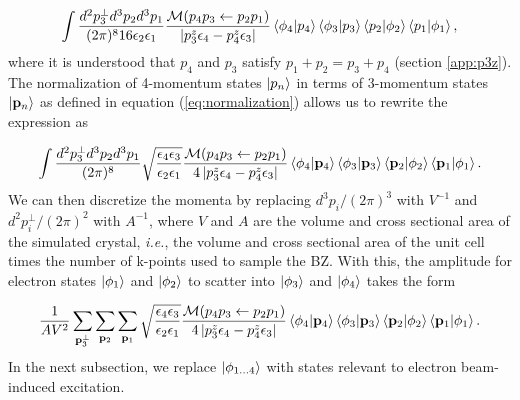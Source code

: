 \documentclass[twoside,twocolumn,9pt]{article}
\begin{document}
\begin{equation} 
  \label{eq:ampUseDelta} 
  \begin{aligned} 
    \int\frac{d^2p_3^\perp
    d^3p_2d^3p_1} {(2\pi)^{8} 16\epsilon_2\epsilon_1}
    \frac{\mathcal{M}(p_4p_3\leftarrow p_2p_1)}
    {\left|p_3^z\epsilon_4 - p_4^z\epsilon_3\right|} \bra{\phi_4}\ket{p_4}
    \bra{\phi_3}\ket{p_3} \bra{p_2}\ket{\phi_2} \bra{p_1}\ket{\phi_1},
  \end{aligned} 
\end{equation}
%
where it is understood that $p_4$ and $p_3$ satisfy $p_1 + p_2 = p_3 + p_4$
(section \ref{app:p3z}).
The normalization of 4-momentum states $\ket{p_n}$ in terms of
3-momentum states $\ket{\mathbf{p}_n}$ as defined in equation
(\ref{eq:normalization}) allows us to rewrite the expression as

\begin{equation} 
  \label{eq:amp3Mom} 
  \begin{aligned} 
    \int\frac{d^2p_3^\perp
    d^3p_2d^3p_1}{(2\pi)^{8}}
    \sqrt{\frac{\epsilon_4\epsilon_3}{\epsilon_2\epsilon_1}}
    \frac{\mathcal{M}(p_4p_3\leftarrow p_2p_1)} {4\left|p_3^z\epsilon_4 -
    p_4^z\epsilon_3\right|} \bra{\phi_4}\ket{\mathbf{p}_4}
    \bra{\phi_3}\ket{\mathbf{p}_3} \bra{\mathbf{p}_2}\ket{\phi_2}
    \bra{\mathbf{p}_1}\ket{\phi_1}.  
  \end{aligned} 
\end{equation}
%
We can then discretize the momenta by replacing $d^3p_i/(2\pi)^3$ with $V^{-1}$
and $d^2p_i^\perp/(2\pi)^2$ with $A^{-1}$, where $V$ and $A$ are the volume and
cross sectional area of the simulated crystal, \textit{i.e.}, the volume and
cross sectional area of the unit cell times the number of k-points used to
sample the BZ.
With this, the amplitude for electron states $\ket{\phi_1}$ and $\ket{\phi_2}$
to scatter into $\ket{\phi_3}$ and $\ket{\phi_4}$ takes the form

\begin{equation} 
  \label{eq:ampDisc} 
  \begin{aligned} 
    \frac{1}{AV^2}
    \sum_{\mathbf{p}_3^\perp} \sum_{\mathbf{p}_2} \sum_{\mathbf{p}_1}
    \sqrt{\frac{\epsilon_4\epsilon_3}{\epsilon_2\epsilon_1}}
    \frac{\mathcal{M}(p_4p_3\leftarrow p_2p_1)} {4\left|p_3^z\epsilon_4 -
    p_4^z\epsilon_3\right|} \bra{\phi_4}\ket{\mathbf{p}_4}
    \bra{\phi_3}\ket{\mathbf{p}_3} \bra{\mathbf{p}_2}\ket{\phi_2}
    \bra{\mathbf{p}_1}\ket{\phi_1}.  
  \end{aligned} 
\end{equation}
%
In the next subsection, we replace $\ket{\phi_{1\dots 4}}$ with states relevant to
electron beam-induced excitation.
\end{document}
